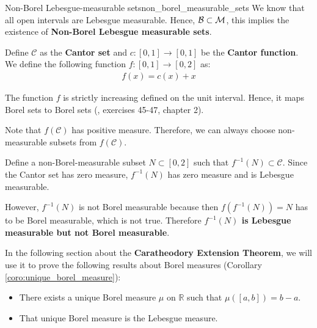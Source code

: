 \begin{proposition}{Non-Borel Lebesgue-measurable sets}{non_borel_measurable_sets}
    We know that all open intervals are Lebesgue measurable. Hence, $\borel \subset \mathcal{M}$, this implies the existence of \textbf{Non-Borel Lebesgue measurable sets}.
\end{proposition}

\begin{proof*}
    Define $\mathcal{C}$ as the \textbf{Cantor set} and $c: [0, 1] \to [0,1]$ be the \textbf{Cantor function}. We define the following function $f:[0,1]\to[0,2]$ as:
    \begin{align*}
        f(x) = c(x) + x
    \end{align*}

    \noindent The function $f$ is strictly increasing defined on the unit interval. Hence, it maps Borel sets to Borel sets (\cite{book:royden}, exercises 45-47, chapter 2). 

    \noindent\newline Note that $f(\mathcal{C})$ has positive measure. Therefore, we can always choose non-measurable subsets from $f(\mathcal{C})$.

    \noindent\newline Define a non-Borel-measurable subset $N\subset[0,2]$ such that $f^{-1}(N)\subset \mathcal{C}$. Since the Cantor set has zero measure, $f^{-1}(N)$ has zero measure and is Lebesgue measurable. 

    \noindent\newline However, $f^{-1}(N)$ is not Borel measurable because then $f(f^{-1}(N))=N$ has to be Borel measurable, which is not true. Therefore \textbf{$f^{-1}(N)$ is Lebesgue measurable but not Borel measurable}. 
\end{proof*}


\noindent In the following section about the \textbf{Caratheodory Extension Theorem}, we will use it to prove the following results about Borel measures (Corollary \ref{coro:unique_borel_measure}):
\begin{itemize}
    \item There exists a unique Borel measure $\mu$ on $\mathbb{R}$ such that $\mu([a, b]) = b-a$.
    \item That unique Borel measure is the Lebesgue measure.
\end{itemize}